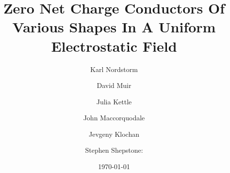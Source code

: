 \documentclass[aps,twocolumn,pre,nofootinbib]{revtex4}
\begin{document}

\newcommand{\breite}{1.0} %


\newtheorem{prop}{Proposition}
\newtheorem{cor}{Corollary}

\newcommand{\be}{\begin{equation}}
\newcommand{\ee}{\end{equation}}

\newcommand{\bea}{\begin{eqnarray}}
\newcommand{\eea}{\end{eqnarray}}

\newcommand{\Reals}{\mathbb{R}}     %
\newcommand{\Int}{\mathbb{Z}}       %
\newcommand{\Com}{\mathbb{C}}       %
\newcommand{\Nat}{\mathbb{N}}       %


\newcommand{\id}{\mathbbm{1}}    

\newcommand{\Real}{\mathop{\mathrm{Re}}}
\newcommand{\Imag}{\mathop{\mathrm{Im}}}

\def\O{\mbox{$\mathcal{O}$}}    
\def\F{\mathcal{F}}			
\def\sgn{\text{sgn}}

\newcommand{\dw}{\ensuremath{\Delta}} %
\newcommand{\wbp}{\ensuremath{\omega_0}}
\newcommand{\dv}{\ensuremath{\delta}}
\newcommand{\vbp}{\ensuremath{\nu_0}}
\newcommand{\vplus}{\ensuremath{\nu_{+}}}
\newcommand{\vminus}{\ensuremath{\nu_{-}}}
\newcommand{\wplus}{\ensuremath{\omega_{+}}}
\newcommand{\wminus}{\ensuremath{\omega_{-}}}



\title{Zero Net Charge Conductors Of Various Shapes In A Uniform Electrostatic Field}


\author{Karl Nordstorm}

\author{David Muir}

\author{Julia Kettle}

\author{John Maccorquodale}

\author{Jevgeny Klochan}

\author{Stephen Shepstone: }



\date{\today}
\end{document}
